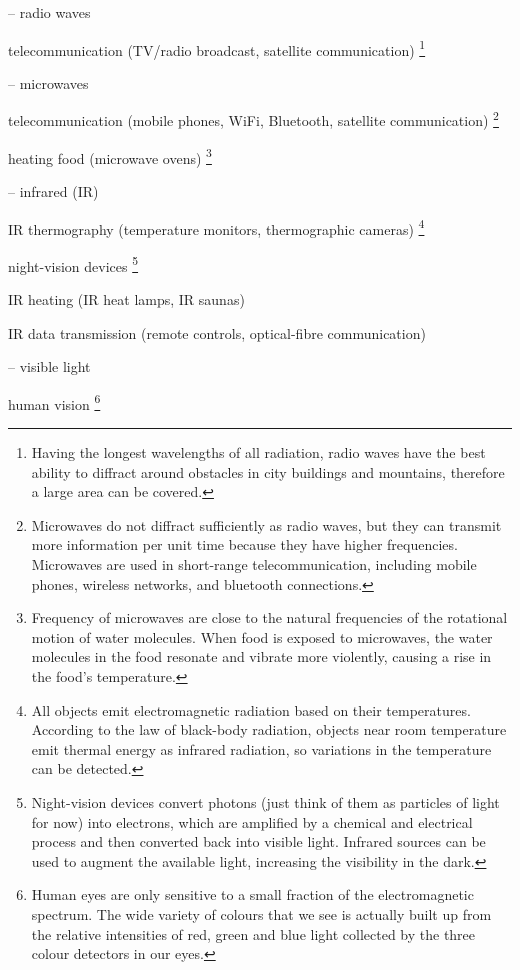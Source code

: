 \begin{compactitem}
	\item[--] radio waves
	
	\xskip telecommunication (TV/radio broadcast, satellite communication) \footnote{Having the longest wavelengths of all radiation, radio waves have the best ability to diffract around obstacles in city buildings and mountains, therefore a large area can be covered.}

	\item[--] microwaves
	
	\xskip telecommunication (mobile phones, WiFi, Bluetooth, satellite communication)
	\footnote{Microwaves do not diffract sufficiently as radio waves, but they can transmit more information per unit time because they have higher frequencies. Microwaves are used in short-range telecommunication, including mobile phones, wireless networks, and bluetooth connections.}
		
		
	\xskip heating food (microwave ovens)
	\footnote{Frequency of microwaves are close to the natural frequencies of the rotational motion of water molecules. When food is exposed to microwaves, the water molecules in the food resonate and vibrate more violently, causing a rise in the food's temperature.}
	
	\item[--] infrared (IR)
	
	\xskip IR thermography (temperature monitors, thermographic cameras)
	\footnote{All objects emit electromagnetic radiation based on their temperatures. According to the law of black-body radiation, objects near room temperature emit thermal energy as infrared radiation, so variations in the temperature can be detected.}
	
	\xskip night-vision devices
	\footnote{Night-vision devices convert photons (just think of them as particles of light for now) into electrons, which are amplified by a chemical and electrical process and then converted back into visible light. Infrared sources can be used to augment the available light, increasing the visibility in the dark.}
	
	\xskip IR heating (IR heat lamps, IR saunas)
	
	
	\xskip IR data transmission (remote controls, optical-fibre communication)
	
	\item[--] visible light
	
	\xskip human vision
	\footnote{Human eyes are only sensitive to a small fraction of the electromagnetic spectrum. The wide variety of colours that we see is actually built up from the relative intensities of red, green and blue light collected by the three colour detectors in our eyes.}
	

\end{compactitem}
